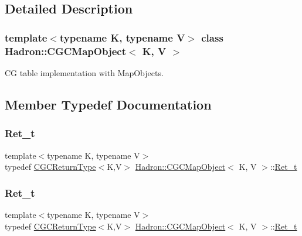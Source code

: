 \subsection{Detailed Description}
\subsubsection*{template$<$typename K, typename V$>$\newline
class Hadron\+::\+C\+G\+C\+Map\+Object$<$ K, V $>$}

CG table implementation with Map\+Objects. 

\subsection{Member Typedef Documentation}
\mbox{\label{classHadron_1_1CGCMapObject_a154c1c2b41f7dad9d5692b4d2c6f5a2c}} 
\subsubsection{\texorpdfstring{Ret\_t}{Ret\_t}\hspace{0.1cm}{\footnotesize\ttfamily [1/3]}}
{\footnotesize\ttfamily template$<$typename K, typename V$>$ \\
typedef \mbox{\hyperlink{structHadron_1_1CGCReturnType}{C\+G\+C\+Return\+Type}}$<$K,V$>$ \mbox{\hyperlink{classHadron_1_1CGCMapObject}{Hadron\+::\+C\+G\+C\+Map\+Object}}$<$ K, V $>$\+::\mbox{\hyperlink{classHadron_1_1CGCMapObject_a154c1c2b41f7dad9d5692b4d2c6f5a2c}{Ret\+\_\+t}}}

\mbox{\label{classHadron_1_1CGCMapObject_a154c1c2b41f7dad9d5692b4d2c6f5a2c}} 
\subsubsection{\texorpdfstring{Ret\_t}{Ret\_t}\hspace{0.1cm}{\footnotesize\ttfamily [2/3]}}
{\footnotesize\ttfamily template$<$typename K, typename V$>$ \\
typedef \mbox{\hyperlink{structHadron_1_1CGCReturnType}{C\+G\+C\+Return\+Type}}$<$K,V$>$ \mbox{\hyperlink{classHadron_1_1CGCMapObject}{Hadron\+::\+C\+G\+C\+Map\+Object}}$<$ K, V $>$\+::\mbox{\hyperlink{classHadron_1_1CGCMapObject_a154c1c2b41f7dad9d5692b4d2c6f5a2c}{Ret\+\_\+t}}}

